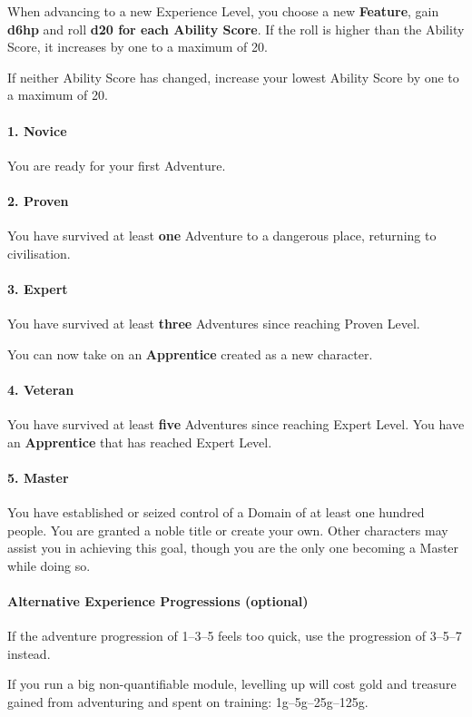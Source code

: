 \documentclass[itdr]{subfiles}
\begin{document}
When advancing to a new Experience Level, you choose a new \textbf{Feature}, gain \textbf{d6hp} and roll \textbf{d20 for each Ability Score}. If the roll is higher than the Ability Score, it increases by one to a maximum of 20.

If neither Ability Score has changed, increase your lowest Ability Score by one to a maximum of 20.

\paragraph{1. Novice}
You are ready for your first Adventure.

\paragraph{2. Proven}
You have survived at least \textbf{one} Adventure to a dangerous place, returning to civilisation.

\paragraph{3. Expert}
You have survived at least \textbf{three} Adventures since reaching Proven Level.

You can now take on an \textbf{Apprentice} created as a new character.

\paragraph{4. Veteran}
You have survived at least \textbf{five} Adventures since reaching Expert Level. You have an \textbf{Apprentice} that has reached Expert Level.

\paragraph{5. Master}
You have established or seized control of a Domain of at least one hundred people. You are granted a noble title or create your own. Other characters may assist you in achieving this goal, though you are the only one becoming a Master while doing so.

\vfill
\begin{dbox}
	\paragraph{Alternative Experience Progressions (optional)}
	If the adventure progression of 1--3--5 feels too quick, use the progression of 3--5--7 instead.

	If you run a big non-quantifiable module, levelling up will cost gold and treasure gained from adventuring and spent on training: 1g--5g--25g--125g.
\end{dbox}
\vfill
\end{document}
